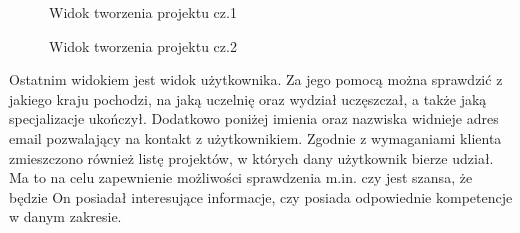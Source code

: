 \begin{figure}[h!]
	\caption{Widok tworzenia projektu cz.1}
	\centering
\end{figure}

\clearpage

\begin{figure}[h!]
	\caption{Widok tworzenia projektu cz.2}
	\centering
\end{figure}


Ostatnim widokiem jest widok użytkownika. Za jego pomocą można sprawdzić z jakiego kraju pochodzi, na jaką uczelnię oraz wydział uczęszczał, a także jaką specjalizacje ukończył. Dodatkowo poniżej imienia oraz nazwiska widnieje adres email pozwalający na kontakt z użytkownikiem. Zgodnie z wymaganiami klienta zmieszczono również listę projektów, w których dany użytkownik bierze udział. Ma to na celu zapewnienie możliwości sprawdzenia m.in. czy jest szansa, że będzie On posiadał interesujące informacje, czy posiada odpowiednie kompetencje w danym zakresie.

